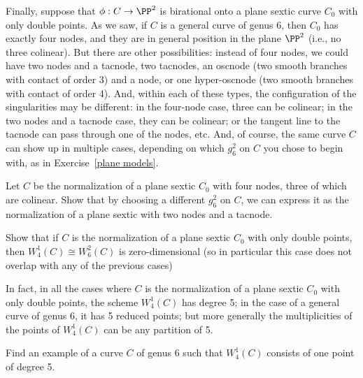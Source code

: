 Finally, suppose that $\phi : C \to \PP^2$ is birational onto a plane sextic curve $C_0$ with only double points. As we saw, if $C$ is a general curve of genus 6, then $C_0$ has exactly four nodes, and they are in general position in the plane $\PP^2$ (i.e., no three colinear). But there are other possibilities: instead of four nodes, we could have two nodes and a tacnode, two tacnodes, an oscnode (two smooth branches with contact of order 3) and a node, or one hyper-oscnode (two smooth branches with contact of order 4). And, within each of these types, the configuration of the singularities may be different: in the four-node case, three can be colinear; in the two nodes and a tacnode case, they can be colinear; or the tangent line to the tacnode can pass through one of the nodes, etc. And, of course, the same curve $C$ can show up in multiple cases, depending on which $g^2_6$ on $C$ you chose to begin with, as in Exercise~\ref{plane models}. 

\begin{exercise}\label{plane models}
Let $C$ be the normalization of a plane sextic $C_0$ with four nodes, three of which are colinear. Show that by choosing a different $g^2_6$ on $C$, we can express it as the normalization of a plane sextic with two nodes and a tacnode.
\end{exercise}


\begin{exercise}
Show that if $C$ is the normalization of a plane sextic $C_0$ with only double points, then $W^1_4(C) \cong W^2_6(C)$ is zero-dimensional (so in particular this case does not overlap with any of the previous cases)
\end{exercise}

In fact, in all the cases where $C$ is the normalization of a plane sextic $C_0$ with only double points, the scheme $W^1_4(C)$ has degree 5; in the  case of a general curve of genus 6, it  has 5 reduced points; but more generally the multiplicities of the points of $W^1_4(C)$ can be any partition of 5.


\begin{exercise}
Find an example of a curve $C$ of genus 6 such that $W^1_4(C)$ consists of one point of degree 5.
\end{exercise}

%

